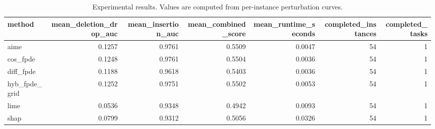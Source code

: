 \begin{table}[t]
\caption{Experimental results. Values are computed from per-instance perturbation curves.}
\label{tab:main_results_computed}
\centering
\begin{tabular}{lrrrrrr}
\toprule
method & mean\_deletion\_drop\_auc & mean\_insertion\_auc & mean\_combined\_score & mean\_runtime\_seconds & completed\_instances & completed\_tasks \\
\midrule
aime & 0.1257 & 0.9761 & 0.5509 & 0.0047 & 54 & 1 \\
cos\_fpde & 0.1248 & 0.9761 & 0.5504 & 0.0036 & 54 & 1 \\
diff\_fpde & 0.1188 & 0.9618 & 0.5403 & 0.0036 & 54 & 1 \\
hyb\_fpde\_grid & 0.1252 & 0.9751 & 0.5502 & 0.0053 & 54 & 1 \\
lime & 0.0536 & 0.9348 & 0.4942 & 0.0093 & 54 & 1 \\
shap & 0.0799 & 0.9312 & 0.5056 & 0.0326 & 54 & 1 \\
\bottomrule
\end{tabular}

\end{table}
